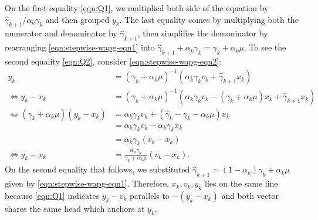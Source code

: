 \documentclass[12pt]{article}
\begin{document}
        On the first equality \eqref{eqn:Q1}, we multiplied both side of the equation by $\hat\gamma_{k + 1}/\alpha_k \gamma_k$ and then grouped $y_k$. 
        The last equality comes by multiplying both the numerator and denominator by $\hat \gamma_{k + 1}$, then simplifies the demoninator by rearranging \eqref{eqn:stepwise-wapg-eqn1} into $\hat \gamma_{k + 1} + \alpha_k \gamma_k = \gamma_k + \alpha_k \mu$. 
        To see the second equality \eqref{eqn:Q2}, consider \eqref{eqn:stepwise-wapg-eqn2}: 
        \begin{align*}
            y_k &= (\gamma_k + \alpha_k \mu)^{-1}(\alpha_k \gamma_k v_k + \hat\gamma_{k + 1} x_k)
            \\
            \iff
            y_k - x_k &= 
            (\gamma_k + \alpha_k \mu)^{-1}
            (\alpha_k \gamma_k v_k - (\gamma_k + \alpha_k \mu)x_k + \hat \gamma_{k + 1} x_k)
            \\
            \iff 
            (\gamma_k + \alpha_k \mu)(y_k - x_k)
            &= 
            \alpha_k\gamma _kv_k + 
            (\hat \gamma_k - \gamma_k - \alpha_k \mu) x_k
            \\
            &= \alpha_k \gamma_k v_k - \alpha_k \gamma_k x_k 
            \\
            &= \alpha_k \gamma_k(v_k - x_k)
            \\
            \iff 
            y_k - x_k &= 
            \frac{\alpha_k \gamma_k}{\gamma_k + \alpha_k \mu}(v_k - x_k). 
        \end{align*}
        On the second equality that follows, we substituted $\hat\gamma_{k + 1} = (1 - \alpha_k)\gamma_k + \alpha_k \mu$ given by \eqref{eqn:stepwise-wapg-eqn1}. 
        Therefore, $x_k, v_k, y_k$ lies on the same line because \eqref{eqn:Q1} indicates $y_k - v_k$ parallels to $-(y_k - x_k)$ and both vector shares the same head which anchors at $y_k$. 
    
\end{document}

